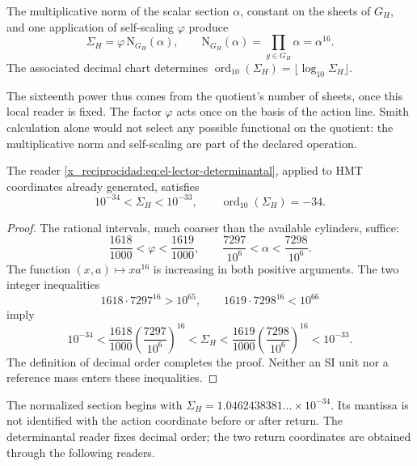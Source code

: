 \begin{definition}
The multiplicative norm of the scalar section \(\alpha\), constant on the sheets of \(G_H\), and one application of self-scaling \(\varphi\) produce
\begin{equation}
 \Sigma_H=\varphi\,\mathrm N_{G_H}(\alpha),\qquad
 \mathrm N_{G_H}(\alpha)=\prod_{g\in G_H}\alpha=\alpha^{16}.
 \label{x_reciprocidad:eq:el-lector-determinantal}
\end{equation}
The associated decimal chart determines \(\operatorname{ord}_{10}(\Sigma_H)=\lfloor\log_{10}\Sigma_H\rfloor\).
\end{definition}

The sixteenth power thus comes from the quotient's number of sheets, once this local reader is fixed. The factor \(\varphi\) acts once on the basis of the action line. Smith calculation alone would not select any possible functional on the quotient: the multiplicative norm and self-scaling are part of the declared operation.

\begin{theorem}
The reader \eqref{x_reciprocidad:eq:el-lector-determinantal}, applied to HMT coordinates already generated, satisfies
\begin{equation}
 10^{-34}<\Sigma_H<10^{-33},\qquad
 \operatorname{ord}_{10}(\Sigma_H)=-34.
 \label{x_reciprocidad:eq:el-decada}
\end{equation}
\end{theorem}
\begin{proof}
The rational intervals, much coarser than the available cylinders, suffice:
\[
 \frac{1618}{1000}<\varphi<\frac{1619}{1000},\qquad
 \frac{7297}{10^6}<\alpha<\frac{7298}{10^6}.
\]
The function \((x,a)\mapsto xa^{16}\) is increasing in both positive
arguments. The two integer inequalities
\[
 1618\cdot7297^{16}>10^{65},\qquad
 1619\cdot7298^{16}<10^{66}
\]
imply
\[
 10^{-34}
 <\frac{1618}{1000}\left(\frac{7297}{10^6}\right)^{16}
 <\Sigma_H
 <\frac{1619}{1000}\left(\frac{7298}{10^6}\right)^{16}
 <10^{-33}.
\]
The definition of decimal order completes the proof. Neither an SI unit nor a reference mass enters these inequalities.
\end{proof}

The normalized section begins with \(\Sigma_H=1.0462438381\ldots\times10^{-34}\). Its mantissa is not identified with the action coordinate before or after return. The determinantal reader fixes decimal order; the two return coordinates are obtained through the following readers.



